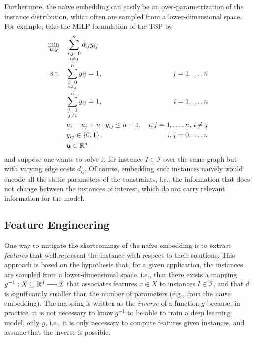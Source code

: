Furthermore, the naïve embedding can easily be an over-parametrization of the instance distribution, which often are sampled from a lower-dimensional space.
For example, take the MILP formulation of the TSP by 
\begin{align*}
    \min_{\bm{u},\bm{y}} \quad & \sum_{\substack{i,j=0 \\ i\neq j}}^{n} d_{ij} y_{ij} & \\
    \textrm{s.t.} \quad & \sum_{\substack{i=0\\i\neq j}}^{n} y_{ij} = 1, &\, j=1,\ldots,n \\
			& \sum_{\substack{j=0\\j\neq i}}^{n} y_{ij} = 1, &\, i=1,\ldots,n \\
			& u_i - u_j + n \cdot y_{ij} \le n - 1, &\, i,j=1,\ldots,n,\, i\neq j\\
			& y_{ij} \in \left\{ 0,1 \right\}, &\, i,j=0,\ldots,n  \\
			& \bm{u} \in \mathbb{R}^{n} &
\end{align*}
and suppose one wants to solve it for instance $I\in \mathcal{I}$ over the same graph but with varying edge costs $d_{ij}$.
Of course, embedding such instances naïvely would encode all the static parameters of the constraints, i.e., the information that does not change between the instances of interest, which do not carry relevant information for the model.


\subsection{Feature Engineering}

One way to mitigate the shortcomings of the naïve embedding is to extract \emph{features} that well represent the instance with respect to their solutions.
This approach is based on the hypothesis that, for a given application, the instances are sampled from a lower-dimensional space, i.e., that there exists a mapping $g^{-1}: X\subseteq\mathbb{R}^{d} \longrightarrow \mathcal{I}$ that associates features $x\in X$ to instances $I\in \mathcal{I}$, and that $d$ is significantly smaller than the number of parameters (e.g., from the naïve embedding).
The mapping is written as the \emph{inverse} of a function $g$ because, in practice, it is not necessary to know $g^{-1}$ to be able to train a deep learning model, only $g$, i.e., it is only necessary to compute features given instances, and assume that the inverse is possible.

